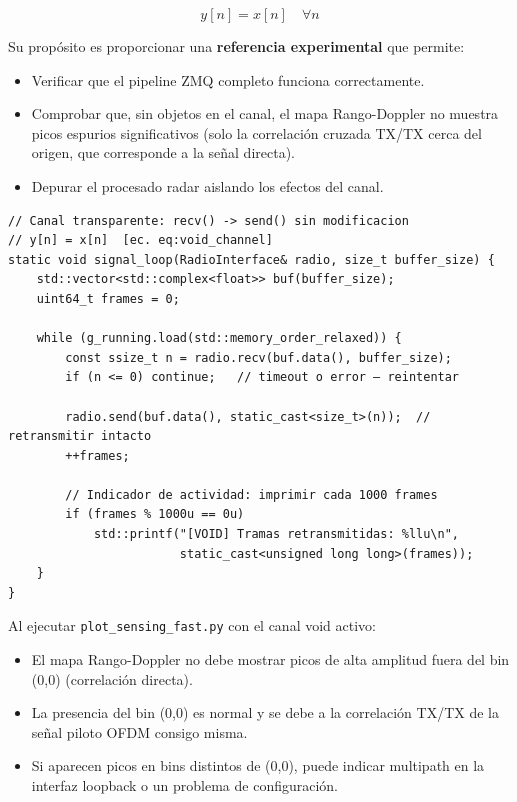\documentclass[11pt,a4paper]{article}
\begin{document}
\begin{equation}
  y[n] = x[n] \quad \forall n
  \label{eq:void_channel}
\end{equation}

Su propósito es proporcionar una \textbf{referencia experimental} que permite:
\begin{itemize}
  \item Verificar que el pipeline ZMQ completo funciona correctamente.
  \item Comprobar que, sin objetos en el canal, el mapa Rango-Doppler no muestra
        picos espurios significativos (solo la correlación cruzada TX/TX cerca del
        origen, que corresponde a la señal directa).
  \item Depurar el procesado radar aislando los efectos del canal.
\end{itemize}

\begin{lstlisting}[style=cpp,
  caption={Bucle principal del canal void — channel\_sim/src/ChannelSimulator\_void.cpp, líneas 30--49}]
// Canal transparente: recv() -> send() sin modificacion
// y[n] = x[n]  [ec. eq:void_channel]
static void signal_loop(RadioInterface& radio, size_t buffer_size) {
    std::vector<std::complex<float>> buf(buffer_size);
    uint64_t frames = 0;

    while (g_running.load(std::memory_order_relaxed)) {
        const ssize_t n = radio.recv(buf.data(), buffer_size);
        if (n <= 0) continue;   // timeout o error — reintentar

        radio.send(buf.data(), static_cast<size_t>(n));  // retransmitir intacto
        ++frames;

        // Indicador de actividad: imprimir cada 1000 frames
        if (frames % 1000u == 0u)
            std::printf("[VOID] Tramas retransmitidas: %llu\n",
                        static_cast<unsigned long long>(frames));
    }
}
\end{lstlisting}

\begin{infobox}
Al ejecutar \texttt{plot\_sensing\_fast.py} con el canal void activo:
\begin{itemize}
  \item El mapa Rango-Doppler no debe mostrar picos de alta amplitud fuera del
        bin (0,0) (correlación directa).
  \item La presencia del bin (0,0) es normal y se debe a la correlación TX/TX
        de la señal piloto OFDM consigo misma.
  \item Si aparecen picos en bins distintos de (0,0), puede indicar multipath
        en la interfaz loopback o un problema de configuración.
\end{itemize}
\end{infobox}
\end{document}
